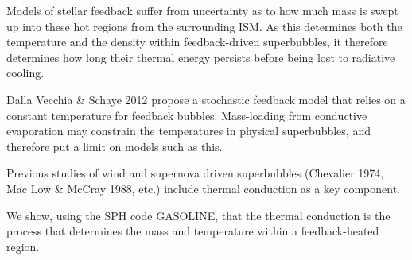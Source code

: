 \documentclass[extrafontsizes, 30pt]{memoir}
\begin{document}
Models of stellar feedback suffer from uncertainty as to how much mass is
swept up into these hot regions from the surrounding ISM.  As this
determines both the temperature and the density within feedback-driven
superbubbles, it therefore determines how long their thermal energy persists
before being lost to radiative cooling. 

Dalla Vecchia \& Schaye 2012 propose a stochastic feedback model that relies on
a constant temperature for feedback bubbles.  Mass-loading from conductive
evaporation may constrain the temperatures in physical superbubbles, and
therefore put a limit on models such as this.

Previous studies of wind and supernova driven superbubbles (Chevalier 1974, Mac Low
\& McCray 1988, etc.) include thermal conduction as a key component.

We show, using the SPH code GASOLINE, that the thermal conduction is the process
that determines the mass and temperature within a feedback-heated region.
\end{document}
